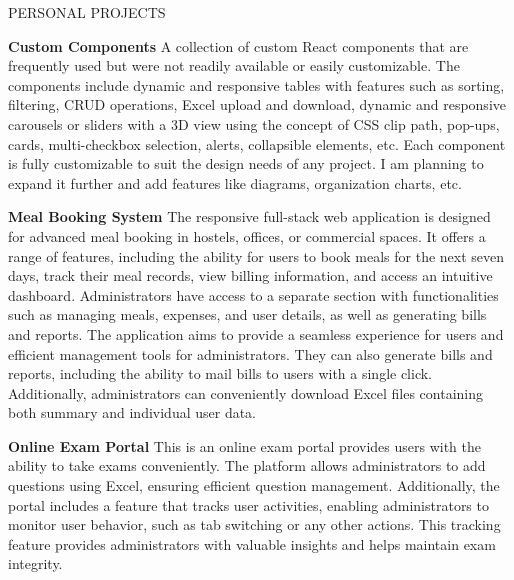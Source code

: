 \documentclass{resume} %
\begin{document}
\begin{rSection}{PERSONAL PROJECTS}
\vspace{-1.25em}


\item \textbf{Custom Components}
\href{https://custom-components-orpin.vercel.app/}{\faExternalLink}
{A collection of custom React components that are frequently used but were not readily available or easily customizable. The components include dynamic and responsive tables with features such as sorting, filtering, CRUD operations, Excel upload and download, dynamic and responsive carousels or sliders with a 3D view using the concept of CSS clip path, pop-ups, cards, multi-checkbox selection, alerts, collapsible elements, etc. Each component is fully customizable to suit the design needs of any project. I am planning to expand it further and add features like diagrams, organization charts, etc.}



\item \textbf{Meal Booking System}
\href{https://meal-booking-system.vercel.app/}{\faExternalLink}
{
The responsive full-stack web application is designed for advanced meal booking in hostels, offices, or commercial spaces. It offers a range of features, including the ability for users to book meals for the next seven days, track their meal records, view billing information, and access an intuitive dashboard. Administrators have access to a separate section with functionalities such as managing meals, expenses, and user details, as well as generating bills and reports. The application aims to provide a seamless experience for users and efficient management tools for administrators. They can also generate bills and reports, including the ability to mail bills to users with a single click. Additionally, administrators can conveniently download Excel files containing both summary and individual user data.}





\item \textbf{Online Exam Portal}
\href{https://react-online-exam-portal.vercel.app/}{\faExternalLink}
{
This is an online exam portal provides users with the ability to take exams conveniently. The platform allows administrators to add questions using Excel, ensuring efficient question management. Additionally, the portal includes a feature that tracks user activities, enabling administrators to monitor user behavior, such as tab switching or any other actions. This tracking feature provides administrators with valuable insights and helps maintain exam integrity.}





\end{rSection}
\end{document}
